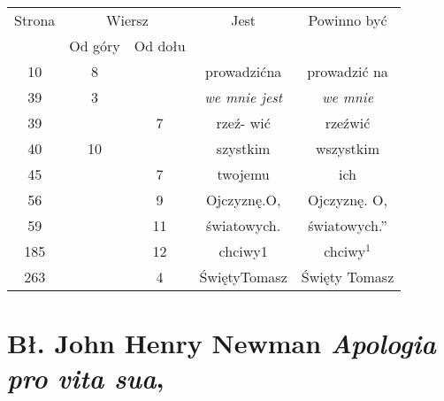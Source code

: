 \documentclass[a4paper,11pt]{article}
\numberwithin{equation}{section}
\begin{document}



\begin{center}

  \begin{tabular}{|c|c|c|c|c|}
    \hline
    Strona & \multicolumn{2}{c|}{Wiersz} & Jest
                              & Powinno być \\ \cline{2-3}
    & Od góry & Od dołu & & \\
    \hline
    \hphantom{0}10 & \hphantom{0}8 & & prowadzićna & prowadzić na \\
    \hphantom{0}39 & \hphantom{0}3 & & \textit{we mnie jest}
    & \textit{we mnie} \\
    \hphantom{0}39 & & \hphantom{0}7 & rzeź- wić & rzeźwić \\
    \hphantom{0}40 & 10 & & szystkim & wszystkim \\
    \hphantom{0}45 & & \hphantom{0}7 & twojemu & ich \\
    \hphantom{0}56 & & \hphantom{0}9 & Ojczyznę.O, & Ojczyznę. O, \\
    \hphantom{0}59 & & 11 & światowych. & światowych.” \\
    185 & & 12 & chciwy1 & chciwy$^{ 1 }$ \\
    263 & & \hphantom{0}4 & ŚwiętyTomasz & Święty Tomasz \\
    \hline
  \end{tabular}

\end{center}

\VerSpaceTwo












\section{Bł. John Henry Newman \textit{Apologia pro vita
    sua}, \parencite{NewmanApologia2009}}

\end{document}
